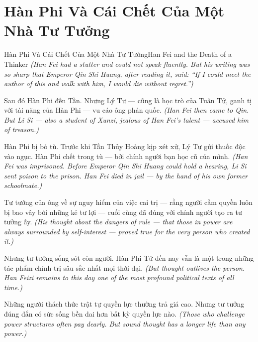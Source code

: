 \section{Hàn Phi Và Cái Chết Của Một Nhà Tư Tưởng}
\begin{truyen}{Hàn Phi Và Cái Chết Của Một Nhà Tư Tưởng}{Han Fei and the Death of a Thinker}
\textit{(Han Fei had a stutter and could not speak fluently. But his writing was so sharp that Emperor Qin Shi Huang, after reading it, said: ``If I could meet the author of this and walk with him, I would die without regret.'')}

Sau đó Hàn Phi đến Tần. Nhưng Lý Tư — cũng là học trò của Tuân Tử, ganh tị với tài năng của Hàn Phi — vu cáo ông phản quốc.
\textit{(Han Fei then came to Qin. But Li Si — also a student of Xunzi, jealous of Han Fei's talent — accused him of treason.)}

Hàn Phi bị bỏ tù. Trước khi Tần Thủy Hoàng kịp xét xử, Lý Tư gửi thuốc độc vào ngục. Hàn Phi chết trong tù — bởi chính người bạn học cũ của mình.
\textit{(Han Fei was imprisoned. Before Emperor Qin Shi Huang could hold a hearing, Li Si sent poison to the prison. Han Fei died in jail — by the hand of his own former schoolmate.)}

Tư tưởng của ông về sự nguy hiểm của việc cai trị — rằng người cầm quyền luôn bị bao vây bởi những kẻ tư lợi — cuối cùng đã đúng với chính người tạo ra tư tưởng ấy.
\textit{(His thought about the dangers of rule — that those in power are always surrounded by self-interest — proved true for the very person who created it.)}

Nhưng tư tưởng sống sót còn người. Hàn Phi Tử đến nay vẫn là một trong những tác phẩm chính trị sâu sắc nhất mọi thời đại.
\textit{(But thought outlives the person. Han Feizi remains to this day one of the most profound political texts of all time.)}

\end{truyen}

\begin{baihoc}
Những người thách thức trật tự quyền lực thường trả giá cao. Nhưng tư tưởng đúng đắn có sức sống bền dai hơn bất kỳ quyền lực nào.
\textit{(Those who challenge power structures often pay dearly. But sound thought has a longer life than any power.)}
\end{baihoc}
